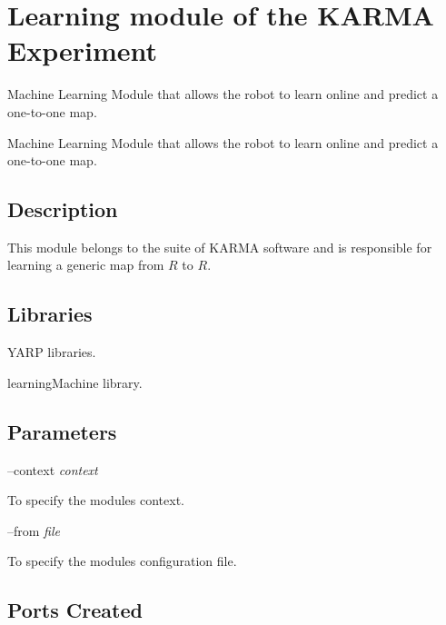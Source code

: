 \section{Learning module of the K\+A\+R\+M\+A Experiment}
\label{group__karmaLearn}


Machine Learning Module that allows the robot to learn online and predict a one-\/to-\/one map.  


Machine Learning Module that allows the robot to learn online and predict a one-\/to-\/one map. 

\hypertarget{group__karmaToolProjection_intro_sec}{}\subsection{Description}\label{group__karmaToolProjection_intro_sec}
This module belongs to the suite of K\+A\+R\+M\+A software and is responsible for learning a generic map from $ R $ to $ R $.\hypertarget{group__karmaToolProjection_lib_sec}{}\subsection{Libraries}\label{group__karmaToolProjection_lib_sec}

\begin{DoxyItemize}
\item Y\+A\+R\+P libraries.
\item learning\+Machine library.
\end{DoxyItemize}\hypertarget{group__karmaToolProjection_parameters_sec}{}\subsection{Parameters}\label{group__karmaToolProjection_parameters_sec}
--context {\itshape context} 
\begin{DoxyItemize}
\item To specify the module\textquotesingle{}s context.
\end{DoxyItemize}

--from {\itshape file} 
\begin{DoxyItemize}
\item To specify the module\textquotesingle{}s configuration file.
\end{DoxyItemize}\hypertarget{group__karmaToolProjection_portsc_sec}{}\subsection{Ports Created}\label{group__karmaToolProjection_portsc_sec}

